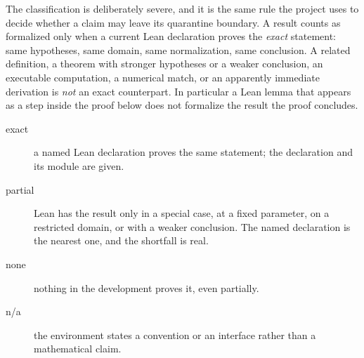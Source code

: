 \documentclass[11pt,a4paper,oneside,openany]{book}
\theoremstyle{definition}
\theoremstyle{remark}
\newcommand{\statusexact}{\textsf{\color{statusgreen}exact}}
\newcommand{\statuspartial}{\textsf{\color{statusamber}partial}}
\newcommand{\statusnone}{\textsf{\color{statusred}none}}
\newcommand{\statusna}{\textsf{n/a}}
\begin{document}
The classification is deliberately severe, and it is the same rule the
project uses to decide whether a claim may leave its quarantine boundary.
A result counts as formalized only when a current Lean declaration proves
the \emph{exact} statement: same hypotheses, same domain, same
normalization, same conclusion.  A related definition, a theorem with
stronger hypotheses or a weaker conclusion, an executable computation, a
numerical match, or an apparently immediate derivation is \emph{not} an
exact counterpart.  In particular a Lean lemma that appears as a step
inside the proof below does not formalize the result the proof concludes.

\begin{description}
\item[\statusexact] a named Lean declaration proves the same statement; the
  declaration and its module are given.
\item[\statuspartial] Lean has the result only in a special case, at a fixed
  parameter, on a restricted domain, or with a weaker conclusion.  The named
  declaration is the nearest one, and the shortfall is real.
\item[\statusnone] nothing in the development proves it, even partially.
\item[\statusna] the environment states a convention or an interface rather
  than a mathematical claim.
\end{description}
\end{document}
